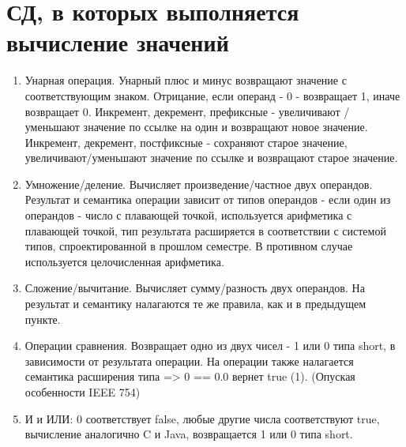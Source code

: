 \documentclass[a4paper,12pt]{article}
\begin{document}
\section{СД, в которых выполняется вычисление значений}
\begin{flushleft}
  \justify
  \begin{enumerate}
    \item Унарная операция. 
    Унарный плюс и минус возвращают значение с соответствующим знаком.
    Отрицание, если операнд - 0 - возвращает 1, иначе возвращает 0.
    Инкремент, декремент, префиксные - увеличивают / уменьшают значение по ссылке на один и возвращают новое значение.
    Инкремент, декремент, постфиксные - сохраняют старое значение, увеличивают/уменьшают значение по ссылке и возвращают старое значение.
    \item Умножение/деление.
    Вычисляет произведение/частное двух операндов. Результат и семантика операции зависит от типов операндов - если один из операндов - число с плавающей точкой,
    используется арифметика с плавающей точкой, тип результата расширяется в соответствии с системой типов, спроектированной в прошлом семестре. В противном случае
    используется целочисленная арифметика.
    \item  Сложение/вычитание.
    Вычисляет сумму/разность двух операндов. На результат и семантику налагаются те же правила, как и в предыдущем пункте.
    \item Операции сравнения.
    Возвращает одно из двух чисел - 1 или 0 типа short, в зависимости от результата операции. На операции также налагается семантика расширения типа => 0 == 0.0 вернет true (1).
    (Опуская особенности IEEE 754)
    \item И и ИЛИ: 0 соответствует false, любые другие числа соответствуют true, вычисление аналогично C и Java, возвращается 1 или 0 типа short.
  \end{enumerate}
\end{flushleft}
\newpage
\end{document}
